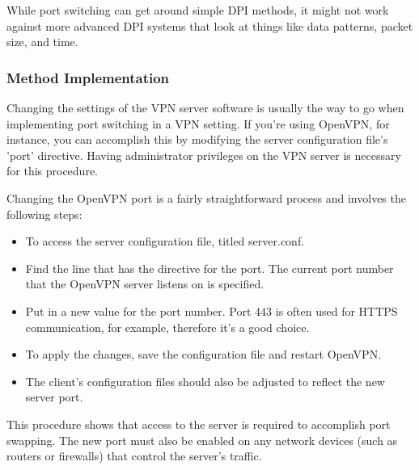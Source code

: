 \documentclass[12pt, fleqn, a4paper]{article}
\begin{document}
While port switching can get around simple DPI methods, it might not work against more advanced DPI systems that look at things like data patterns, packet size, and time.
\subsubsection{Method Implementation}
Changing the settings of the VPN server software is usually the way to go when implementing port switching in a VPN setting. If you're using OpenVPN, for instance, you can accomplish this by modifying the server configuration file's 'port' directive. Having administrator privileges on the VPN server is necessary for this procedure.

Changing the OpenVPN port is a fairly straightforward process and involves the following steps:
\begin{itemize}
\item To access the server configuration file, titled server.conf.
\item Find the line that has the directive for the port. The current port number that the OpenVPN server listens on is specified.
\item Put in a new value for the port number. Port 443 is often used for HTTPS communication, for example, therefore it's a good choice.
\item To apply the changes, save the configuration file and restart OpenVPN.
\item The client's configuration files should also be adjusted to reflect the new server port.
\end{itemize}

This procedure shows that access to the server is required to accomplish port swapping. The new port must also be enabled on any network devices (such as routers or firewalls) that control the server's traffic.
\end{document}
